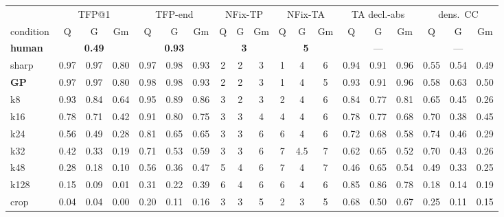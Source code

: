 \begin{tabular}{l *{18}{c}}
\toprule
& \multicolumn{3}{c}{TFP@1} & \multicolumn{3}{c}{TFP-end} & \multicolumn{3}{c}{NFix-TP}
& \multicolumn{3}{c}{NFix-TA} & \multicolumn{3}{c}{TA decl.-abs} & \multicolumn{3}{c}{dens.\ CC} \\
\cmidrule(lr){2-4}\cmidrule(lr){5-7}\cmidrule(lr){8-10}\cmidrule(lr){11-13}\cmidrule(lr){14-16}\cmidrule(lr){17-19}
condition & Q & G & Gm & Q & G & Gm & Q & G & Gm & Q & G & Gm & Q & G & Gm & Q & G & Gm \\
\midrule
\textbf{human} & \multicolumn{3}{c}{\textbf{0.49}} & \multicolumn{3}{c}{\textbf{0.93}}
& \multicolumn{3}{c}{\textbf{3}} & \multicolumn{3}{c}{\textbf{5}}
& \multicolumn{3}{c}{---} & \multicolumn{3}{c}{---} \\
\midrule
sharp                  & 0.97 & 0.97 & 0.80 & 0.97 & 0.98 & 0.93 & 2 & 2 & 3 & 1 & 4 & 6 & 0.94 & 0.91 & 0.96 & 0.55 & 0.54 & 0.49 \\
\textbf{GP} & 0.97 & 0.97 & 0.80 & 0.98 & 0.98 & 0.93 & 2 & 2 & 3 & 1 & 4 & 5 & 0.93 & 0.91 & 0.96 & 0.58 & 0.63 & 0.50 \\
k8                     & 0.93 & 0.84 & 0.64 & 0.95 & 0.89 & 0.86 & 3 & 2 & 3 & 2 & 4 & 6 & 0.84 & 0.77 & 0.81 & 0.65 & 0.45 & 0.26 \\
k16                    & 0.78 & 0.71 & 0.42 & 0.91 & 0.80 & 0.75 & 3 & 3 & 4 & 4 & 4 & 6 & 0.78 & 0.77 & 0.68 & 0.70 & 0.38 & 0.45 \\
k24                    & 0.56 & 0.49 & 0.28 & 0.81 & 0.65 & 0.65 & 3 & 3 & 6 & 6 & 4 & 6 & 0.72 & 0.68 & 0.58 & 0.74 & 0.46 & 0.29 \\
k32                    & 0.42 & 0.33 & 0.19 & 0.71 & 0.53 & 0.59 & 3 & 3 & 6 & 7 & 4.5 & 7 & 0.62 & 0.65 & 0.52 & 0.70 & 0.43 & 0.26 \\
k48                    & 0.28 & 0.18 & 0.10 & 0.56 & 0.36 & 0.47 & 5 & 4 & 6 & 7 & 4 & 7 & 0.46 & 0.65 & 0.54 & 0.49 & 0.33 & 0.25 \\
k128                   & 0.15 & 0.09 & 0.01 & 0.31 & 0.22 & 0.39 & 6 & 4 & 6 & 6 & 4 & 6 & 0.85 & 0.86 & 0.78 & 0.18 & 0.14 & 0.19 \\
crop                   & 0.04 & 0.04 & 0.00 & 0.20 & 0.11 & 0.16 & 3 & 3 & 5 & 2 & 3 & 5 & 0.68 & 0.50 & 0.67 & 0.25 & 0.11 & 0.15 \\
\bottomrule
\end{tabular}